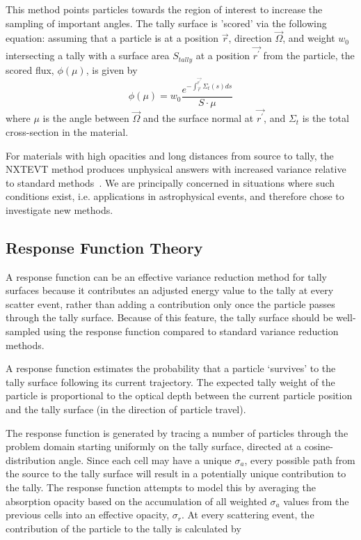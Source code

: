\documentclass[]{article}
\begin{document}
		This method points particles towards the region of interest to increase the sampling of important angles. The tally surface is 'scored' via the following equation: assuming that a particle is at a position $\vec{r}$, direction $\vec{\Omega}$, and weight $w_{0}$ intersecting a tally with a surface area $S_{tally}$ at a position $\vec{r^{\prime}}$ from the particle, the scored flux, $\phi(\mu)$, is given by
		\begin{equation}
			\phi(\mu) = w_{0} \frac{e^{-\int_{\vec{r}}^{\vec{r^{\prime}}} \Sigma_{t}(s)ds}}{S \cdot \mu}
		\end{equation}
		where $\mu$ is the angle between $\vec{\Omega}$ and the surface normal at $\vec{r^{\prime}}$, and $\Sigma_{t}$ is the total cross-section in the material. 

		For materials with high opacities and long distances from source to tally, the NXTEVT method produces unphysical answers with increased variance relative to standard methods~\cite{KH86}. We are principally concerned in situations where such conditions exist, i.e. applications in astrophysical events, and therefore chose to investigate new methods. 
		
	\subsection{Response Function Theory}
		A response function can be an effective variance reduction method for tally surfaces because it contributes an adjusted energy value to the tally at every scatter event, rather than adding a contribution only once the particle passes through the tally surface. Because of this feature, the tally surface should be well-sampled using the response function compared to standard variance reduction methods. 
	
		A response function estimates the probability that a particle `survives' to the tally surface following its current trajectory. The expected tally weight of the particle is proportional to the optical depth between the current particle position and the tally surface (in the direction of particle travel).

		The response function is generated by tracing a number of particles through the problem domain starting uniformly on the tally surface, directed at a cosine-distribution angle. Since each cell may have a unique $\sigma_{a}$, every possible path from the source to the tally surface will result in a potentially unique contribution to the tally. The response function attempts to model this by averaging the absorption opacity based on the accumulation of all weighted $\sigma_{a}$ values from the previous cells into an effective opacity, $\sigma_{r}$. At every scattering event, the contribution of the particle to the tally is calculated by
\end{document}

